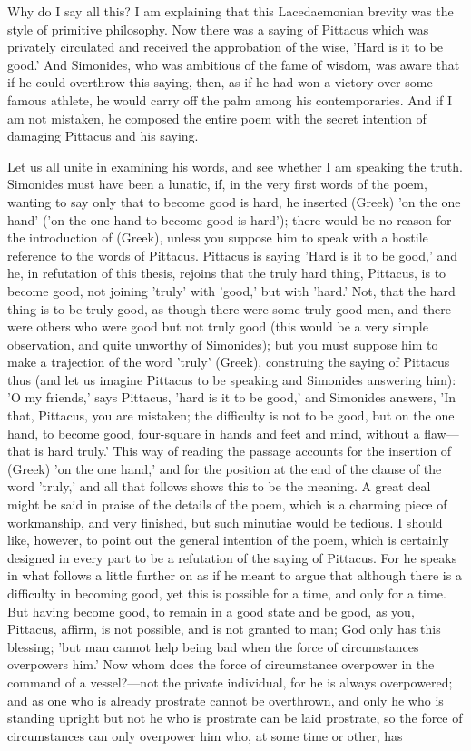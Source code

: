 \documentclass[11pt,letter]{article}
\begin{document}
\par  Why do I say all this? I am explaining that this Lacedaemonian brevity was the style of primitive philosophy. Now there was a saying of Pittacus which was privately circulated and received the approbation of the wise, 'Hard is it to be good.' And Simonides, who was ambitious of the fame of wisdom, was aware that if he could overthrow this saying, then, as if he had won a victory over some famous athlete, he would carry off the palm among his contemporaries. And if I am not mistaken, he composed the entire poem with the secret intention of damaging Pittacus and his saying.

\par  Let us all unite in examining his words, and see whether I am speaking the truth. Simonides must have been a lunatic, if, in the very first words of the poem, wanting to say only that to become good is hard, he inserted (Greek) 'on the one hand' ('on the one hand to become good is hard'); there would be no reason for the introduction of (Greek), unless you suppose him to speak with a hostile reference to the words of Pittacus. Pittacus is saying 'Hard is it to be good,' and he, in refutation of this thesis, rejoins that the truly hard thing, Pittacus, is to become good, not joining 'truly' with 'good,' but with 'hard.' Not, that the hard thing is to be truly good, as though there were some truly good men, and there were others who were good but not truly good (this would be a very simple observation, and quite unworthy of Simonides); but you must suppose him to make a trajection of the word 'truly' (Greek), construing the saying of Pittacus thus (and let us imagine Pittacus to be speaking and Simonides answering him): 'O my friends,' says Pittacus, 'hard is it to be good,' and Simonides answers, 'In that, Pittacus, you are mistaken; the difficulty is not to be good, but on the one hand, to become good, four-square in hands and feet and mind, without a flaw—that is hard truly.' This way of reading the passage accounts for the insertion of (Greek) 'on the one hand,' and for the position at the end of the clause of the word 'truly,' and all that follows shows this to be the meaning. A great deal might be said in praise of the details of the poem, which is a charming piece of workmanship, and very finished, but such minutiae would be tedious. I should like, however, to point out the general intention of the poem, which is certainly designed in every part to be a refutation of the saying of Pittacus. For he speaks in what follows a little further on as if he meant to argue that although there is a difficulty in becoming good, yet this is possible for a time, and only for a time. But having become good, to remain in a good state and be good, as you, Pittacus, affirm, is not possible, and is not granted to man; God only has this blessing; 'but man cannot help being bad when the force of circumstances overpowers him.' Now whom does the force of circumstance overpower in the command of a vessel?—not the private individual, for he is always overpowered; and as one who is already prostrate cannot be overthrown, and only he who is standing upright but not he who is prostrate can be laid prostrate, so the force of circumstances can only overpower him who, at some time or other, has 
\end{document}
